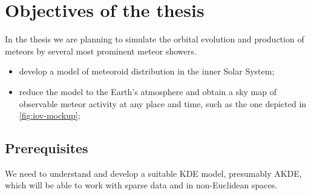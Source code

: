 \section{Objectives of the thesis} \label{iO}
    In the thesis we are planning to simulate the orbital evolution and production of meteors
    by several most prominent meteor showers.

    \begin{itemize}
        \item develop a model of meteoroid distribution in the inner Solar System;
        \item reduce the model to the Earth's atmosphere and obtain a sky map
            of observable meteor activity at any place and time,
            such as the one depicted in \cref{fig:iov-mockup};
    \end{itemize}

    \subsection{Prerequisites} \label{iOp}
        We need to understand and develop a suitable KDE model, presumably AKDE,
        which will be able to work with sparse data and in non-Euclidean spaces.

